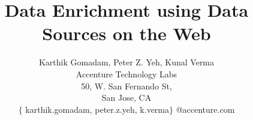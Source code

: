 \documentclass[letterpaper]{article}
\begin{document}
%
\title{Data Enrichment using Data Sources on the Web}
\author{Karthik Gomadam, Peter Z. Yeh, Kunal Verma\\
Accenture Technology Labs\\
50, W. San Fernando St,\\
San Jose, CA\\
$\lbrace$ karthik.gomadam, peter.z.yeh, k.verma$\rbrace$ @accenture.com
}
\maketitle





%


\end{document}

